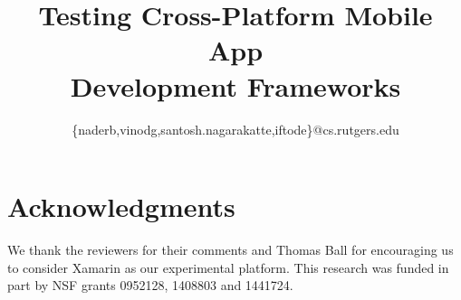 \documentclass[conference]{IEEEtran}
\newcommand{\myparagraphnodot}[1]{\parskip 5pt \noindent\textbf{\textit{#1}}}
\newcommand{\myparagraph}[1]{\myparagraphnodot{#1.}}
\begin{document}
\title{Testing Cross-Platform Mobile App\\Development Frameworks}
\author{
\{naderb,vinodg,santosh.nagarakatte,iftode\}@cs.rutgers.edu}

\maketitle
\begin{abstract}
%

%
\end{abstract}












\section{Acknowledgments}
%
We thank the reviewers for their comments and Thomas Ball for encouraging us 
to consider Xamarin as our experimental platform. This research was funded in
part by NSF grants 0952128, 1408803 and 1441724.

\small
\let\oldthebibliography=\thebibliography
  \let\endoldthebibliography=\endthebibliography
  \renewenvironment{thebibliography}[1]{%
    \begin{oldthebibliography}{#1}%
      \setlength{\parskip}{0.01ex}%
      \setlength{\itemsep}{.01ex}%
  }%
  {%
    \end{oldthebibliography}%
  }




\end{document}
